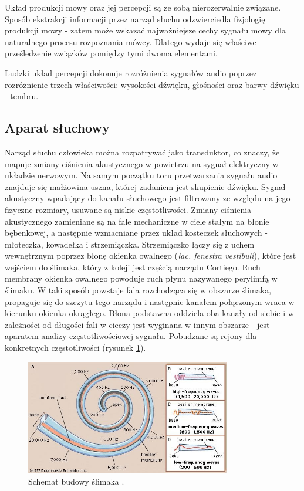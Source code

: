 Układ produkcji mowy oraz jej percepcji są ze sobą nierozerwalnie związane. Sposób ekstrakcji informacji przez narząd słuchu odzwierciedla fizjologię produkcji mowy - zatem może wskazać najważniejsze cechy sygnału mowy dla naturalnego procesu rozpoznania mówcy. Dlatego wydaje się właściwe prześledzenie związków pomiędzy tymi dwoma elementami.

Ludzki układ percepcji dokonuje rozróżnienia sygnałów audio poprzez rozróżnienie trzech właściwości: wysokości dźwięku, głośności oraz barwy dźwięku - tembru. 

\subsection{Aparat słuchowy}
Narząd słuchu człowieka można rozpatrywać jako transduktor, co znaczy, że mapuje zmiany ciśnienia akustycznego w powietrzu na sygnał elektryczny w układzie nerwowym. Na samym początku toru przetwarzania sygnału audio znajduje się małżowina uszna, której zadaniem jest skupienie dźwięku. Sygnał akustyczny wpadający do kanału słuchowego jest filtrowany ze względu na jego fizyczne rozmiary, usuwane są niskie częstotliwości. Zmiany ciśnienia akustycznego zamieniane są na fale mechaniczne w ciele
stałym na błonie bębenkowej, a następnie wzmacniane przez układ kosteczek słuchowych - młoteczka, kowadełka i strzemiączka. Strzemiączko łączy się z uchem wewnętrznym poprzez błonę okienka owalnego (\textit{łac. fenestra vestibuli}), które jest wejściem do ślimaka, który z koleji jest częścią narządu Cortiego. Ruch membrany okienka owalnego powoduje ruch płynu nazywanego perylimfą w ślimaku. W taki sposób powstaje fala rozchodząca się w obszarze ślimaka, propaguje się do szczytu tego narządu i następnie kanałem połączonym wraca w kierunku okienka okrągłego. Błona podstawna oddziela oba kanały od siebie i w zależności od długości fali w cieczy jest wyginana w innym obszarze - jest aparatem analizy częstotliwościowej sygnału. Pobudzane są rejony dla konkretnych częstotliwości (rysunek \ref{fig:ucho}).
\begin{figure}[ht!]
  \centering
    \includegraphics[width=0.8\textwidth]{./ucho.jpg}
    \caption{\label{fig:ucho} Schemat budowy ślimaka \cite{enciclopidiabritanica}.}
\end{figure}
